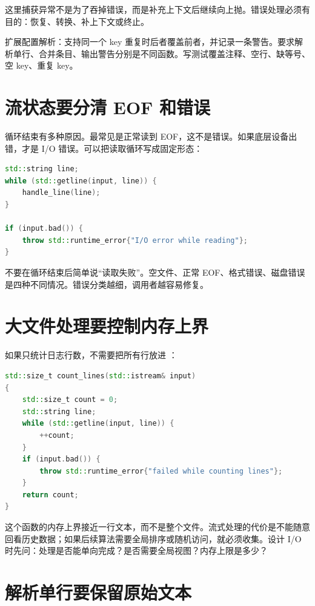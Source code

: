 这里捕获异常不是为了吞掉错误，而是补充上下文后继续向上抛。错误处理必须有目的：恢复、转换、补上下文或终止。

\begin{exercisebox}
扩展配置解析：支持同一个 key 重复时后者覆盖前者，并记录一条警告。要求解析单行、合并条目、输出警告分别是不同函数。写测试覆盖注释、空行、缺等号、空 key、重复 key。
\end{exercisebox}

\section{流状态要分清 EOF 和错误}

 循环结束有多种原因。最常见是正常读到 EOF，这不是错误。如果底层设备出错，才是 I/O 错误。可以把读取循环写成固定形态：

\begin{lstlisting}[language=C++,caption={读取结束后检查 bad 状态}]
std::string line;
while (std::getline(input, line)) {
    handle_line(line);
}

if (input.bad()) {
    throw std::runtime_error{"I/O error while reading"};
}
\end{lstlisting}

不要在循环结束后简单说“读取失败”。空文件、正常 EOF、格式错误、磁盘错误是四种不同情况。错误分类越细，调用者越容易修复。

\section{大文件处理要控制内存上界}

如果只统计日志行数，不需要把所有行放进 ：

\begin{lstlisting}[language=C++,caption={流式统计行数}]
std::size_t count_lines(std::istream& input)
{
    std::size_t count = 0;
    std::string line;
    while (std::getline(input, line)) {
        ++count;
    }
    if (input.bad()) {
        throw std::runtime_error{"failed while counting lines"};
    }
    return count;
}
\end{lstlisting}

这个函数的内存上界接近一行文本，而不是整个文件。流式处理的代价是不能随意回看历史数据；如果后续算法需要全局排序或随机访问，就必须收集。设计 I/O 时先问：处理是否能单向完成？是否需要全局视图？内存上限是多少？

\section{解析单行要保留原始文本}

